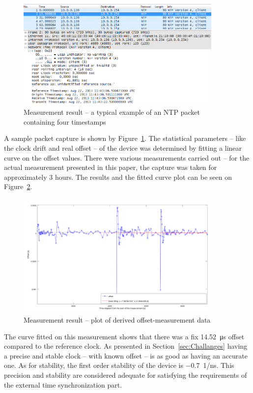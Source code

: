 \documentclass[journal]{IEEEtran}
\begin{document}
\begin{figure}[!htb]
    \centering
    \includegraphics[width=0.9\textwidth]{figures_raw/pcap-NTP.png}
    \caption{Measurement result -- a typical example of an NTP packet containing four timestamps}
    \label{fig:pcap-NTP}
\end{figure}

A sample packet capture is shown by Figure~\ref{fig:pcap-NTP}. The statistical parameters -- like the clock drift and real
offset -- of the device was determined by
fitting a linear curve on the offset values. There were various measurements carried out -- for the actual measurement presented in this paper, the capture was taken
for approximately 3 hours.
The results and the fitted curve plot can be seen on Figure~\ref{fig:results}.

\begin{figure}[!htb]
    \centering
    \includegraphics[width=0.9\textwidth]{figures_raw/plot2.png}
    \caption{Measurement result -- plot of derived offset-measurement data}
    \label{fig:results}
\end{figure}

The curve fitted on this measurement shows that there was a fix \SI{14.52}{\micro\second} offset compared to the
reference clock. As presented in Section~\ref{sec:Challanges}
having a precise and stable clock -- with known offset -- is as good as having an accurate one. As for stability,
the first order stability of the
device is \SI{-0.7}{1/\nano\second}. This precision and stability are considered adequate for satisfying the
requirements of the external time synchronization part.
\end{document}

